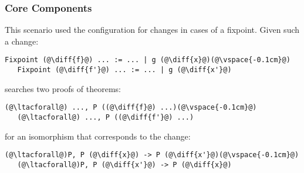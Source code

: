 






\subsubsection{Core Components}

This scenario used the configuration for changes in cases of a fixpoint.
Given such a change:

\begin{lstlisting}[language=coq]
   Fixpoint (@\diff{f}@) ... := ... | g (@\diff{x}@)(@\vspace{-0.1cm}@)
   Fixpoint (@\diff{f'}@) ... := ... | g (@\diff{x'}@)
\end{lstlisting}
\sysname searches two proofs of theorems:

\begin{lstlisting}[language=coq]
   (@\ltacforall@) ..., P ((@\diff{f}@) ...)(@\vspace{-0.1cm}@)
   (@\ltacforall@) ..., P ((@\diff{f'}@) ...)
\end{lstlisting}
for an isomorphism that corresponds to the change:

\begin{lstlisting}[language=coq]
   (@\ltacforall@)P, P (@\diff{x}@) -> P (@\diff{x'}@)(@\vspace{-0.1cm}@)
   (@\ltacforall@)P, P (@\diff{x'}@) -> P (@\diff{x}@)
\end{lstlisting}

